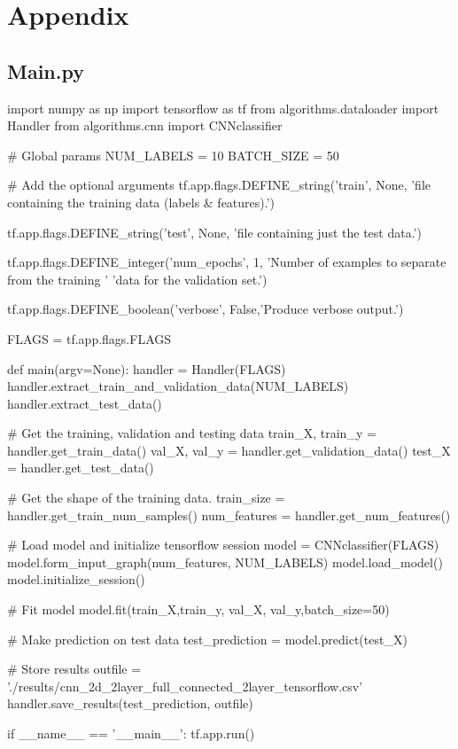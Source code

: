 \documentclass{article}
\begin{document}
\section*{Appendix}

\subsection*{Main.py}
\begin{python}
import numpy as np
import tensorflow as tf
from algorithms.dataloader import Handler
from algorithms.cnn import CNNclassifier


# Global params
NUM_LABELS = 10
BATCH_SIZE = 50

# Add the optional arguments
tf.app.flags.DEFINE_string('train', None,
    'file containing the training data (labels & features).')

tf.app.flags.DEFINE_string('test', None,
    'file containing just the test data.')

tf.app.flags.DEFINE_integer('num_epochs', 1,
    'Number of examples to separate from the training '
    'data for the validation set.')

tf.app.flags.DEFINE_boolean('verbose', False,'Produce verbose output.')

FLAGS = tf.app.flags.FLAGS


def main(argv=None):
    handler = Handler(FLAGS)
    handler.extract_train_and_validation_data(NUM_LABELS)
    handler.extract_test_data()


    # Get the training, validation and testing data
    train_X, train_y = handler.get_train_data()
    val_X, val_y = handler.get_validation_data()
    test_X = handler.get_test_data()


    # Get the shape of the training data.
    train_size = handler.get_train_num_samples()
    num_features = handler.get_num_features()

    # Load model and initialize tensorflow session
    model = CNNclassifier(FLAGS)
    model.form_input_graph(num_features, NUM_LABELS)
    model.load_model()
    model.initialize_session()

    # Fit model
    model.fit(train_X,train_y, val_X, val_y,batch_size=50)

    # Make prediction on test data
    test_prediction = model.predict(test_X)

    # Store results
    outfile = './results/cnn_2d_2layer_full_connected_2layer_tensorflow.csv'
    handler.save_results(test_prediction, outfile)

if __name__ == '__main__':
    tf.app.run()
\end{python}
\end{document}
